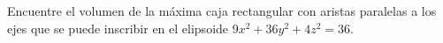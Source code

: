 \item Encuentre el volumen de la máxima caja rectangular con aristas paralelas a los ejes que se puede inscribir en el elipsoide $9x^2 + 36y^2 + 4z^2 = 36$.
